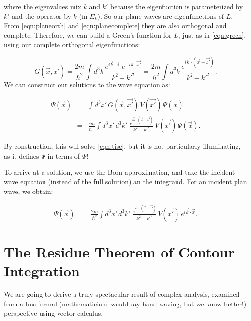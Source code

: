 \documentclass[12pt]{article}
\begin{document}
where the eigenvalues mix $k$ and $k'$ because the eigenfuction is parameterized
by $k'$ and the operator by $k$ (in $E_k$).  So our plane waves are
eigenfunctions of $L$.  From \eqref{eqn:planeorth} and \eqref{eqn:planecomplete}
they are also orthogonal and complete.  Therefore, we can build a Green's function for $L$, just as in \eqref{eqn:green}, using our complete orthogonal eigenfunctions:

\begin{displaymath}
G(\vec{x},\vec{x'}) 
= \frac{2m}{\hbar^2} \int d^3k \, 
\frac{e^{\textstyle i\vec{k}\cdot \vec{x}} \; e^{\textstyle -i\vec{k} \cdot \vec{x'}}}
{k^2-k'^2} 
= \frac{2m}{\hbar^2} \int d^3k \, 
\frac{e^{\textstyle i\vec{k}\cdot (\vec{x}-\vec{x'})}}
{k^2-k'^2}. 
\end{displaymath}
We can construct our solutions to the wave equation as:

\begin{eqnarray*}
\Psi(\vec{x})&=&\int d^3x' \, G(\vec{x},\vec{x'})\,V(\vec{x'})\,\Psi(\vec{x})\\
&=&
\frac{2m}{\hbar^2} 
\int d^3x'\,d^3k'\; 
\frac{e^{\textstyle i\vec{k}\cdot (\vec{x}-\vec{x'})}}
{k^2-k'^2}\,V(\vec{x'})\,\Psi(\vec{x}).
\end{eqnarray*}

By construction, this will solve \eqref{eqn:tise}, but it is not particularly
illuminating, as it defines $\Psi$ in terms of $\Psi$!

To arrive at a solution, we use the Born approximation, and take the incident wave equation (instead of the full solution) an the integrand.  For an incident plan wave, we obtain:

\begin{eqnarray*}
\Psi(\vec{x})&=&
\frac{2m}{\hbar^2} 
\int d^3x'\,d^3k'\; 
\frac{e^{\textstyle i\vec{k}\cdot (\vec{x}-\vec{x'})}}
{k^2-k'^2}\,V(\vec{x'})\,e^{\textstyle i\vec{k}\cdot\vec{x}}.
\end{eqnarray*}



\section{The Residue Theorem of Contour Integration} 

We are going to derive a truly spectacular result of complex analysis, examined from a
less formal (mathematicians would say hand-waving, but we know better!)
perspective using vector calculus.
\end{document}

